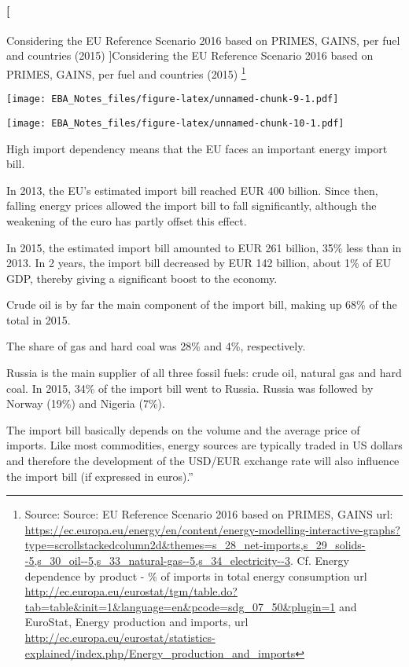 \documentclass[]{book}
\let\oldparagraph\paragraph
\renewcommand{\paragraph}[1]{\oldparagraph{#1}\mbox{}}
\let\rmarkdownfootnote\footnote%
\def\footnote{\protect\rmarkdownfootnote}
\theoremstyle{definition}
\theoremstyle{definition}
\theoremstyle{definition}
\theoremstyle{remark}
\begin{document}
\paragraph[Considering the EU Reference Scenario 2016 based on PRIMES,
GAINS, per fuel and countries (2015) ]{\texorpdfstring{Considering the
EU Reference Scenario 2016 based on PRIMES, GAINS, per fuel and
countries (2015) \footnote{Source: Source: EU Reference Scenario 2016
  based on PRIMES, GAINS url:
  \url{https://ec.europa.eu/energy/en/content/energy-modelling-interactive-graphs?type=scrollstackedcolumn2d\&themes=s_28_net-imports,s_29_solids--5,s_30_oil--5,s_33_natural-gas--5,s_34_electricity--3}.
  Cf. Energy dependence by product - \% of imports in total energy
  consumption url
  \url{http://ec.europa.eu/eurostat/tgm/table.do?tab=table\&init=1\&language=en\&pcode=sdg_07_50\&plugin=1}
  and EuroStat, Energy production and imports, url
  \url{http://ec.europa.eu/eurostat/statistics-explained/index.php/Energy_production_and_imports}}}{Considering the EU Reference Scenario 2016 based on PRIMES, GAINS, per fuel and countries (2015) }}\label{considering-the-eu-reference-scenario-2016-based-on-primes-gains-per-fuel-and-countries-2015-7}

\texttt{[image: EBA\_Notes\_files/figure-latex/unnamed-chunk-9-1.pdf]}

\texttt{[image: EBA\_Notes\_files/figure-latex/unnamed-chunk-10-1.pdf]}

High import dependency means that the EU faces an important energy
import bill.

In 2013, the EU's estimated import bill reached EUR 400 billion. Since
then, falling energy prices allowed the import bill to fall
significantly, although the weakening of the euro has partly offset this
effect.

In 2015, the estimated import bill amounted to EUR 261 billion, 35\%
less than in 2013. In 2 years, the import bill decreased by EUR 142
billion, about 1\% of EU GDP, thereby giving a significant boost to the
economy.

Crude oil is by far the main component of the import bill, making up
68\% of the total in 2015.

The share of gas and hard coal was 28\% and 4\%, respectively.

Russia is the main supplier of all three fossil fuels: crude oil,
natural gas and hard coal. In 2015, 34\% of the import bill went to
Russia. Russia was followed by Norway (19\%) and Nigeria (7\%).

The import bill basically depends on the volume and the average price of
imports. Like most commodities, energy sources are typically traded in
US dollars and therefore the development of the USD/EUR exchange rate
will also influence the import bill (if expressed in euros).''
\end{document}
